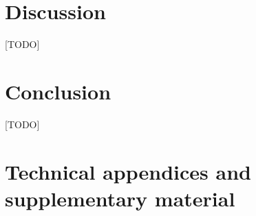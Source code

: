 \documentclass{article}
\begin{document}
\section{Discussion}
[TODO]
\section{Conclusion}
[TODO]


\newpage
\appendix

\section{Technical appendices and supplementary material}



\newpage




\end{document}
